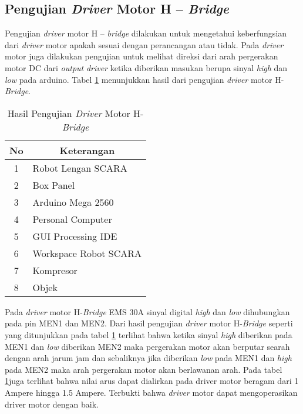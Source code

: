 \subsection{Pengujian \textit{Driver} Motor H – \textit{Bridge}}
Pengujian \textit{driver} motor H – \textit{bridge} dilakukan untuk mengetahui keberfungsian dari \textit{driver} motor apakah sesuai dengan perancangan atau tidak. Pada \textit{driver} motor juga dilakukan pengujian untuk melihat direksi dari arah pergerakan motor DC dari \textit{output} \textit{driver} ketika diberikan masukan berupa sinyal \textit{high} dan \textit{low} pada arduino. Tabel \ref{tbl.drivermotor} menunjukkan hasil dari pengujian \textit{driver} motor H-\textit{Bridge}. 
\begin{table}[H]
	\centering
	\caption{Hasil Pengujian \textit{Driver} Motor H-\textit{Bridge}}
		\label{tbl.drivermotor}
	\begin{tabular}{|c|l|}
		\hline
		\rowcolor[HTML]{9B9B9B} 
	
		No & \multicolumn{1}{c|}{\cellcolor[HTML]{9B9B9B}Keterangan} \\ \hline
		1  & Robot Lengan SCARA                                      \\ \hline
		2  & Box Panel                                               \\ \hline
		3  & Arduino Mega 2560                                       \\ \hline
		4  & Personal Computer                                       \\ \hline
		5  & GUI Processing IDE                                      \\ \hline
		6  & Workspace Robot SCARA                                   \\ \hline
		7  & Kompresor                                               \\ \hline
		8  & Objek                                                   \\ \hline
	\end{tabular}
	
\end{table} 

 Pada \textit{driver} motor H-\textit{Bridge} EMS 30A sinyal digital \textit{high} dan \textit{low} dihubungkan pada pin MEN1 dan MEN2. Dari hasil pengujian \textit{driver} motor H-\textit{Bridge} seperti yang ditunjukkan pada tabel \ref{tbl.drivermotor} terlihat bahwa ketika sinyal \textit{high} diberikan pada MEN1 dan \textit{low} diberikan MEN2 maka pergerakan motor akan berputar searah dengan arah jarum jam dan sebaliknya jika diberikan \textit{low} pada MEN1 dan \textit{high} pada MEN2 maka arah pergerakan motor akan berlawanan arah. Pada tabel \ref{tbl.drivermotor}juga terlihat bahwa nilai arus dapat dialirkan pada driver motor beragam dari 1 Ampere hingga 1.5 Ampere. Terbukti bahwa \textit{driver} motor dapat mengoperasikan driver motor dengan baik.
